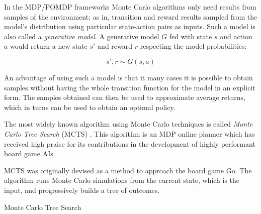 In the MDP/POMDP frameworks Monte Carlo algorithms only need results from samples of the
environment; as in, transition and reward results sampled from the model's distribution using
particular state-action pairs as inputs. Such a model is also called a \textit{generative model}. A
generative model $G$ fed with state $s$ and action $a$ would return a new state $s'$ and reward $r$
respecting the model probabilities:

\[ s', r \sim G(s, a) \]

An advantage of using such a model is that it many cases it is possible to obtain samples without
having the whole transition function for the model in an explicit form. The samples obtained can
then be used to approximate average returns, which in turns can be used to obtain an optimal policy.

The most widely known algorithm using Monte Carlo techniques is called \textit{Monte Carlo Tree
Search} (MCTS) \cite{cit:mcts}. This algorithm is an MDP online planner which has received high
praise for its contributions in the development of highly performant board game AIs.

MCTS was originally devised as a method to approach the board game Go. The algorithm runs Monte
Carlo simulations from the current state, which is the input, and progressively builds
a tree of outcomes.

\begin{algorithm}
\begin{multicols}{2}
    \caption{Monte Carlo Tree Search}


    \setcounter{AlgoLine}{0}

    \setcounter{AlgoLine}{0}

\end{multicols}
\end{algorithm}

